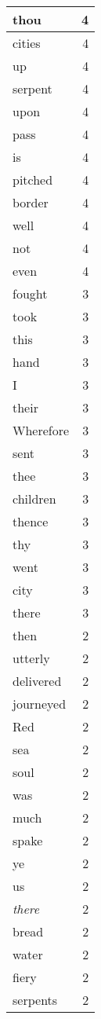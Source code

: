 \begin{center}
\begin{longtable}{l|r}
thou & 4 \\ \hline
cities & 4 \\ \hline
up & 4 \\ \hline
serpent & 4 \\ \hline
upon & 4 \\ \hline
pass & 4 \\ \hline
is & 4 \\ \hline
pitched & 4 \\ \hline
border & 4 \\ \hline
well & 4 \\ \hline
not & 4 \\ \hline
even & 4 \\ \hline
fought & 3 \\ \hline
took & 3 \\ \hline
this & 3 \\ \hline
hand & 3 \\ \hline
I & 3 \\ \hline
their & 3 \\ \hline
Wherefore & 3 \\ \hline
sent & 3 \\ \hline
thee & 3 \\ \hline
children & 3 \\ \hline
thence & 3 \\ \hline
thy & 3 \\ \hline
went & 3 \\ \hline
city & 3 \\ \hline
there & 3 \\ \hline
then & 2 \\ \hline
utterly & 2 \\ \hline
delivered & 2 \\ \hline
journeyed & 2 \\ \hline
Red & 2 \\ \hline
sea & 2 \\ \hline
soul & 2 \\ \hline
was & 2 \\ \hline
much & 2 \\ \hline
spake & 2 \\ \hline
ye & 2 \\ \hline
us & 2 \\ \hline
\emph{there} & 2 \\ \hline
bread & 2 \\ \hline
water & 2 \\ \hline
fiery & 2 \\ \hline
serpents & 2 \\ \hline

\end{longtable}
\end{center}

